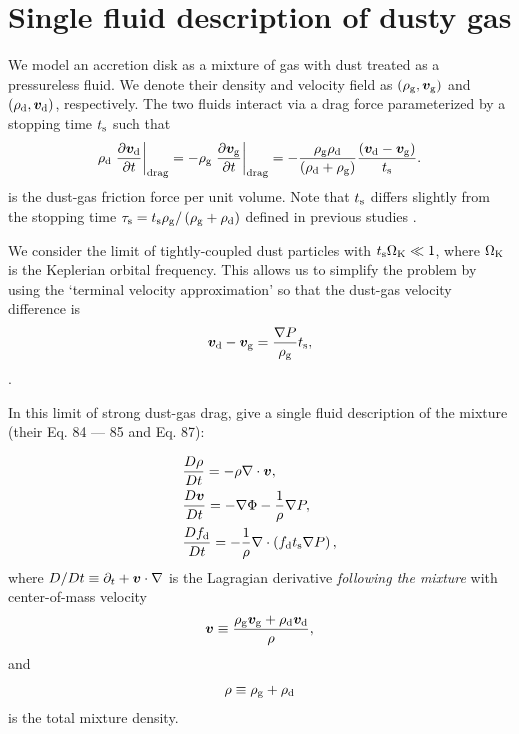 \section{Single fluid description of dusty gas}\label{setup} 
We model an accretion disk as a mixture of gas with dust treated as a 
pressureless fluid. We denote their density and
velocity field as $(\rho_\mathrm{g},\bm{v}_\mathrm{g})$ and
$(\rho_\mathrm{d},\bm{v}_\mathrm{d})$, respectively. The two fluids 
interact via a drag force parameterized by a stopping time $t_\mathrm{s}$
such that 
\begin{align}  
  \rho_\mathrm{d}\left.\frac{\partial \bm{v}_\mathrm{d}}{\partial t}\right|_\mathrm{drag}= -
  \rho_\mathrm{g}\left.\frac{\partial \bm{v}_\mathrm{g}}{\partial t}\right|_\mathrm{drag}=
  - \frac{\rho_\mathrm{g}\rho_\mathrm{d}}{\left(\rho_\mathrm{d}+\rho_\mathrm{g}\right)}\frac{\left(\bm{v}_\mathrm{d} -
    \bm{v}_\mathrm{g}\right)}{t_\mathrm{s}}. 
\end{align}
is the dust-gas friction force per unit volume. Note that $t_\mathrm{s}$ 
differs slightly from the stopping time $\tau_\mathrm{s} =
t_\mathrm{s}\rho_\mathrm{g}/\left(\rho_\mathrm{g}+\rho_\mathrm{d}\right)$ defined in previous studies
\citep[e.g.][]{youdin05a,jacquet11}.   

We consider the limit of tightly-coupled dust particles with 
$t_\mathrm{s}\Omega_{\rm K}\ll 1 $, where $\Omega_{\rm K}$ is the Keplerian orbital
frequency. This allows us to simplify the problem by using the
`terminal velocity approximation' so that the dust-gas velocity
difference is 
\begin{align}
  \bm{v}_\mathrm{d} - \bm{v}_\mathrm{g} = \frac{\nabla
    P}{\rho_\mathrm{g}}t_\mathrm{s}, 
\end{align}
\citep{youdin05a,jacquet11}. 

In this limit of strong dust-gas drag, \cite{laibe14} give a single
fluid description of the mixture (their Eq. 84 --- 85 and Eq. 87):  

\begin{align}
  &\frac{D\rho}{Dt} = -\rho\nabla\cdot\bm{v}, \label{masseq}\\ 
  &\frac{D\bm{v}}{Dt} = - \nabla\Phi - \frac{1}{\rho}\nabla  P, \label{momeq}\\ 
  &\frac{Df_\mathrm{d}}{Dt} = -\frac{1}{\rho} \nabla \cdot \left(f_\mathrm{d} 
  t_\mathrm{s} \nabla P \right),\label{dusteq}  
\end{align}
where $D/Dt \equiv \partial_t + \bm{v}\cdot\nabla$ is the Lagragian
derivative \emph{following the mixture} with center-of-mass velocity  
\begin{align}
  \bm{v} \equiv \frac{\rho_\mathrm{g}\bm{v}_\mathrm{g} + 
    \rho_\mathrm{d}\bm{v}_\mathrm{d}}{\rho}, 
\end{align}
and 
\begin{align}
  \rho \equiv \rho_\mathrm{g} + \rho_\mathrm{d}
\end{align}
is the total mixture density. 

